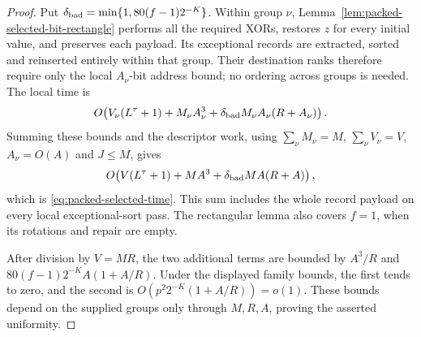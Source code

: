 \begin{proof}
Put $\delta_{\rm bad}=\min\{1,80(f-1)2^{-K}\}$. Within group $\nu$,
Lemma~\ref{lem:packed-selected-bit-rectangle} performs all the required
XORs, restores $z$ for every initial value, and preserves each payload.
Its exceptional records are extracted, sorted and reinserted entirely
within that group. Their destination ranks therefore require only the
local $A_\nu$-bit address bound; no ordering across groups is needed.
The local time is
\[
 O\!\left(V_\nu(L^\tau+1)+M_\nu A_\nu^3+
       \delta_{\rm bad}M_\nu A_\nu(R+A_\nu)\right).
\]
Summing these bounds and the descriptor work, using
$\sum_\nu M_\nu=M$, $\sum_\nu V_\nu=V$, $A_\nu=O(A)$ and $J\le M$,
gives
\[
 O\!\left(V(L^\tau+1)+MA^3+
       \delta_{\rm bad}MA(R+A)\right),
\]
which is \eqref{eq:packed-selected-time}. This sum includes the whole
record payload on every local exceptional-sort pass. The rectangular
lemma also covers $f=1$, when its rotations and repair are empty.

After division by $V=MR$, the two additional terms are bounded by
$A^3/R$ and $80(f-1)2^{-K}A(1+A/R)$. Under the displayed family bounds,
the first tends to zero, and the second is
$O(p^2 2^{-K}(1+A/R))=o(1)$. These bounds depend on the supplied groups
only through $M,R,A$, proving the asserted uniformity.
\end{proof}

